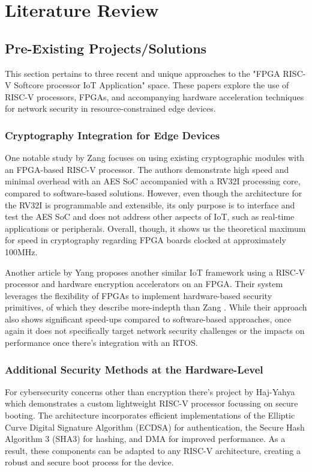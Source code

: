 \chapter[Literature Review]{Literature Review}
\label{Chap:Literature Review}

\section{Pre-Existing Projects/Solutions}
This section pertains to three recent and unique approaches to the "FPGA RISC-V Softcore processor IoT Application" space. These papers explore the use of RISC-V processors, FPGAs, and accompanying hardware acceleration techniques for network security in resource-constrained edge devices.

\subsection{Cryptography Integration for Edge Devices}
One notable study by Zang \etal \cite{Zang2019} focuses on using existing cryptographic modules with an FPGA-based RISC-V processor. The authors demonstrate high speed and minimal overhead with an AES SoC accompanied with a RV32I processing core, compared to software-based solutions. However, even though the architecture for the RV32I is programmable and extensible, its only purpose is to interface and test the AES SoC and does not address other aspects of IoT, such as real-time applications or peripherals. Overall, though, it shows us the theoretical maximum for speed in cryptography regarding FPGA boards clocked at approximately 100MHz.

Another article by Yang \etal \cite{Yang2023} proposes another similar IoT framework using a RISC-V processor and hardware encryption accelerators on an FPGA. Their system leverages the flexibility of FPGAs to implement hardware-based security primitives, of which they describe more-indepth than Zang \etal \cite{Zang2019}. While their approach also shows significant speed-ups compared to software-based approaches, once again it does not specifically target network security challenges or the impacts on performance once there's integration with an RTOS.

\subsection{Additional Security Methods at the Hardware-Level}
For cybersecurity concerns other than encryption there's project by Haj-Yahya \etal \cite{Haj-Yahya2019} which demonstrates a custom lightweight RISC-V processor focussing on secure booting. The architecture incorporates efficient implementations of the Elliptic Curve Digital Signature Algorithm (ECDSA) for authentication, the Secure Hash Algorithm 3 (SHA3) for hashing, and DMA for improved performance. As a result, these components can be adapted to any RISC-V architecture, creating a robust and secure boot process for the device.

